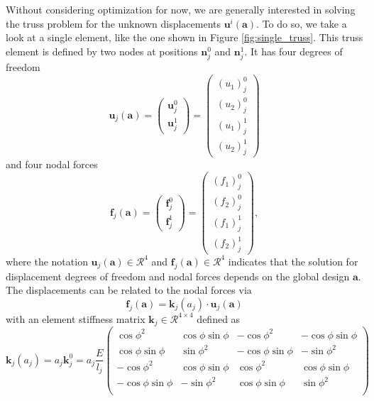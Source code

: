 Without considering optimization for now, we are generally interested in solving the truss problem for the unknown displacements $\mathbf{u}^i(\mathbf{a})$. To do so, we take a look at a single element, like the one shown in Figure \ref{fig:single_truss}. This truss element is defined by two nodes at positions $\mathbf{n}^0_j$ and $\mathbf{n}^1_j$. It has four degrees of freedom 
\begin{equation}
    \mathbf{u}_j (\mathbf{a}) = 
    \begin{pmatrix}
        \mathbf{u}^0_j \\  \mathbf{u}^1_j
    \end{pmatrix}
    = 
    \begin{pmatrix}
        (u_1)^0_j \\ (u_2)^0_j \\  (u_1)^1_j \\ (u_2)^1_j
    \end{pmatrix}
\end{equation} 
and four nodal forces 
\begin{equation}
    \mathbf{f}_j (\mathbf{a}) = 
    \begin{pmatrix}
        \mathbf{f}^0_j \\  \mathbf{f}^1_j
    \end{pmatrix}
    = 
    \begin{pmatrix}
        (f_1)^0_j\\ (f_2)^0_j\\ (f_1)^1_j \\ (f_2)^1_j
    \end{pmatrix},
\end{equation} 
where the notation $\mathbf{u}_j(\mathbf{a}) \in \mathcal{R}^4$ and $\mathbf{f}_j (\mathbf{a}) \in \mathcal{R}^4$ indicates that the solution for displacement degrees of freedom and nodal forces depends on the global design $\mathbf{a}$. 
The displacements can be related to the nodal forces via 
\begin{equation}
    \mathbf{f}_j (\mathbf{a}) = \mathbf{k}_j(a_j) \cdot \mathbf{u}_j (\mathbf{a})
\end{equation}
with an element stiffness matrix $\mathbf{k}_j \in \mathcal{R}^{4\times4}$ defined as 
\begin{equation}
    \mathbf{k}_j(a_j) = a_j \mathbf{k}_j^0 = a_j\frac{E}{l_j}
    \begin{pmatrix}
    \cos{\phi}^2 & \cos{\phi}\sin{\phi} & -\cos{\phi}^2 & -\cos{\phi}\sin{\phi} \\
    \cos{\phi}\sin{\phi} & \sin{\phi}^2 & -\cos{\phi}\sin{\phi} & -\sin{\phi}^2 \\
    -\cos{\phi}^2 & \cos{\phi}\sin{\phi} & \cos{\phi}^2 &\cos{\phi}\sin{\phi} \\
    -\cos{\phi}\sin{\phi} & -\sin{\phi}^2 & \cos{\phi}\sin{\phi} & \sin{\phi}^2 \\
    \end{pmatrix}
\end{equation}
